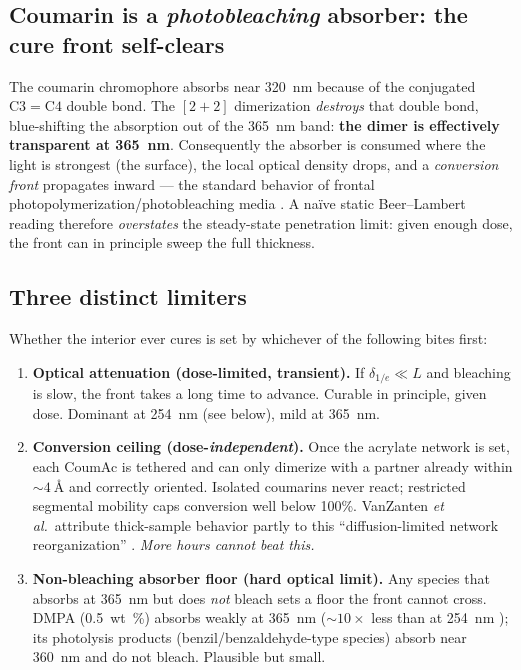 \documentclass[11pt]{article}
\begin{document}
\subsection{Coumarin is a \emph{photobleaching} absorber: the cure front self-clears}
The coumarin chromophore absorbs near \SI{320}{nm} because of the conjugated
$\mathrm{C3{=}C4}$ double bond. The $[2+2]$ dimerization \emph{destroys} that double bond,
blue-shifting the absorption out of the \SI{365}{nm} band: \textbf{the dimer is effectively
transparent at \SI{365}{nm}}. Consequently the absorber is consumed where the light is
strongest (the surface), the local optical density drops, and a \emph{conversion front}
propagates inward --- the standard behavior of frontal photopolymerization/photobleaching
media \cite{cabral2005,terrones2001}. A na\"ive static Beer--Lambert reading therefore
\emph{overstates} the steady-state penetration limit: given enough dose, the front can in
principle sweep the full thickness.

\subsection{Three distinct limiters}
Whether the interior ever cures is set by whichever of the following bites first:
\begin{enumerate}[leftmargin=*]
  \item \textbf{Optical attenuation (dose-limited, transient).} If $\delta_{1/e}\ll L$ and
  bleaching is slow, the front takes a long time to advance. Curable in principle, given
  dose. Dominant at \SI{254}{nm} (see below), mild at \SI{365}{nm}.
  \item \textbf{Conversion ceiling (dose-\emph{independent}).} Once the acrylate network is
  set, each CoumAc is tethered and can only dimerize with a partner already within
  $\sim\SI{4}{\angstrom}$ and correctly oriented. Isolated coumarins never react;
  restricted segmental mobility caps conversion well below 100\%. VanZanten \emph{et al.}\
  attribute thick-sample behavior partly to this ``diffusion-limited network
  reorganization'' \cite{vanzanten2026}. \emph{More hours cannot beat this.}
  \item \textbf{Non-bleaching absorber floor (hard optical limit).} Any species that
  absorbs at \SI{365}{nm} but does \emph{not} bleach sets a floor the front cannot cross.
  DMPA (\SI{0.5}{wt\%}) absorbs weakly at \SI{365}{nm} ($\sim\!10\times$ less than at
  \SI{254}{nm} \cite{vanzanten2026}); its photolysis products (benzil/benzaldehyde-type
  species) absorb near \SI{360}{nm} and do not bleach. Plausible but small.
\end{enumerate}
\end{document}
